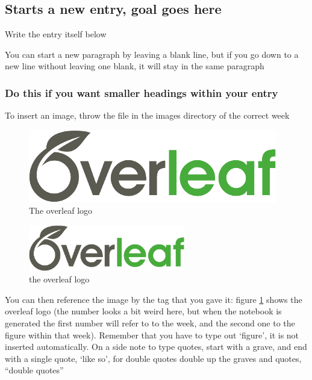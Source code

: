 \documentclass{article}
\begin{document}

\subsection{Starts a new entry, goal goes here}
Write the entry itself below

You can start a new paragraph by leaving a blank line,
but if you go down to a new line without leaving one blank, it will stay in the same paragraph

\subsubsection{Do this if you want smaller headings within your entry}

To insert an image, throw the file in the images directory of the correct week
\begin{figure} %
    \centering
    \includegraphics[width=.6\textwidth]{overleaf.png} %
    \caption{The overleaf logo} %
    \label{fig:overleaf} %
\end{figure}

\begin{figure}
    \centering
    \includegraphics[height=2cm]{overleaf.png}
    \caption{the overleaf logo}
    \label{fig:o}
\end{figure}

You can then reference the image by the tag that you gave it: figure \ref{fig:overleaf} shows the overleaf logo (the number looks a bit weird here, but when the notebook is generated the first number will refer to to the week, and the second one to the figure within that week). Remember that you have to type out `figure', it is not inserted automatically. On a side note to type quotes, start with a grave, and end with a single quote, `like so', for double quotes double up the graves and quotes, ``double quotes''
\end{document}
